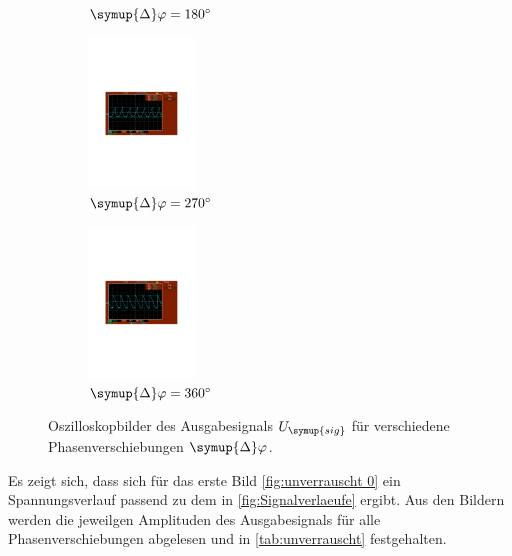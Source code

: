 \begin{figure} [H]
\begin{subfigure}{0.48\textwidth}
    \caption{$\symup{\Delta}\varphi = \qty{180}{\degree}$}
  \end{subfigure}
  \begin{subfigure}{0.48\textwidth}
    \centering
    \includegraphics[height=4cm]{content/Bilder/unverrauscht/270.pdf}
    \caption{$\symup{\Delta}\varphi = \qty{270}{\degree}$}
  \end{subfigure}
  \begin{subfigure}{0.48\textwidth}
    \centering
    \includegraphics[height=4cm]{content/Bilder/unverrauscht/360.pdf}
    \caption{$\symup{\Delta}\varphi = \qty{360}{\degree}$}
  \end{subfigure}
  \caption{Oszilloskopbilder des Ausgabesignals $U_{\symup{sig}}$ für verschiedene Phasenverschiebungen $\symup{\Delta}\varphi$.}
  \label{fig:Bilder normal}
\end{figure}

Es zeigt sich, dass sich für das erste Bild \autoref{fig:unverrauscht 0} ein Spannungsverlauf passend zu dem in 
\autoref{fig:Signalverlaeufe} ergibt.
Aus den Bildern werden die jeweilgen Amplituden des Ausgabesignals für alle Phasenverschiebungen abgelesen und
in \autoref{tab:unverrauscht} festgehalten.

